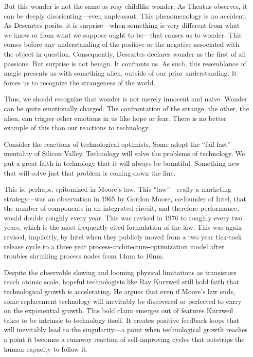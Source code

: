 \documentclass[12pt, letterpaper]{article}
\begin{document}
But this wonder is not the same as rosy childlike wonder.
As Theatus observes, it can be deeply disorienting---even unpleasant.
This phenomenology is no accident.
As Descartes posits, it is surprise---when something is very different from what
we know or from what we suppose ought to be---that causes us to wonder.
This comes before any understanding of the positive or the negative associated
with the object in question.
Consequently, Descartes declares wonder as the first of all passions.
But surprise is not benign.
It confronts us.
As such, this resemblance of magic presents us with something alien, outside of
our prior understanding.
It forces us to recognize the strangeness of the world.

Thus, we should recognize that wonder is not merely innocent and naive.
Wonder can be quite emotionally charged.
The confrontation of the strange, the other, the alien, can trigger other
emotions in us like hope or fear.
There is no better example of this than our reactions to technology.

Consider the reactions of technological optimists.
Some adopt the ``fail fast'' mentality of Silicon Valley.
Technology will solve the problems of technology.
We put a great faith in technology that it will always be bountiful.
Something new that will solve just that problem is coming down the line.

This is, perhaps, epitomized in Moore's law.
This ``law''---really a marketing strategy---was an observation in 1965 
by Gordon Moore,
co-founder of Intel, that the number of components in an integrated circuit, and
therefore performance, would double roughly every year.
This was revised in 1976 to roughly every two years, which is the most
frequently cited formulation of the law.
This was again revised, implicitly, by Intel when they publicly moved from a two
year tick-tock release cycle to a three year process-architecture-optimization
model after troubles shrinking process nodes from 14nm to 10nm.

Despite the observable slowing and looming physical limitations as transistors
reach atomic scale, hopeful technologists like Ray Kurzweil still hold faith
that technological growth is accelerating.
He argues that even if Moore's law ends, some replacement technology will
inevitably be discovered or perfected to carry on the exponential growth.
This bold claim emerges out of features Kurzweil takes to be intrinsic to
technology itself.
It creates positive feedback loops that will inevitably lead to the
singularity---a point when technological growth reaches a point it becomes
a runaway reaction of self-improving cycles that outstrips the human capacity to
follow it.
\end{document}

